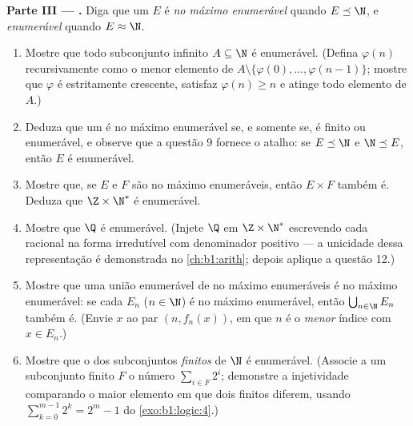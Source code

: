 \begin{problem}
\medskip
\noindent\textbf{Parte III --- .} Diga que um
 $E$ é \emph{no máximo enumerável} quando $E \preceq \N$, e
\emph{enumerável} quando $E \approx \N$.
\begin{enumerate}
  \item Mostre que todo subconjunto infinito $A \subseteq \N$ é
        enumerável. (Defina $\varphi(n)$ recursivamente como o menor
        elemento de $A \setminus \{\varphi(0), \dots,
        \varphi(n-1)\}$; mostre que $\varphi$ é estritamente
        crescente, satisfaz $\varphi(n) \geq n$ e atinge todo elemento de
        $A$.)
  \item Deduza que um  é no máximo enumerável se, e somente se, é
        finito ou enumerável, e observe que a questão 9 fornece o
        atalho: se $E \preceq \N$ e $\N \preceq E$, então $E$ é
        enumerável.
  \item Mostre que, se $E$ e $F$ são no máximo enumeráveis, então $E
        \times F$ também é. Deduza que $\Z \times \N^*$ é enumerável.
  \item Mostre que $\Q$ é enumerável. (Injete $\Q$ em $\Z \times
        \N^*$ escrevendo cada racional na forma irredutível com denominador
        positivo --- a unicidade dessa representação é
        demonstrada no \cref{ch:b1:arith}; depois aplique a questão 12.)
  \item Mostre que uma união enumerável de  no máximo enumeráveis
        é no máximo enumerável: se cada $E_n$ ($n \in \N$) é no máximo
        enumerável, então $\bigcup_{n \in \N} E_n$ também é. (Envie $x$ ao
        par $(n, f_n(x))$, em que $n$ é o \emph{menor} índice com
        $x \in E_n$.)
  \item Mostre que o  dos subconjuntos \emph{finitos} de $\N$ é
        enumerável. (Associe a um subconjunto finito $F$ o número $\sum_{i \in F} 2^i$;
        demonstre a injetividade comparando o maior elemento em que dois
         finitos diferem, usando $\sum_{k=0}^{m-1} 2^k = 2^m - 1$
        do \cref{exo:b1:logic:4}.)
\end{enumerate}


\end{problem}
